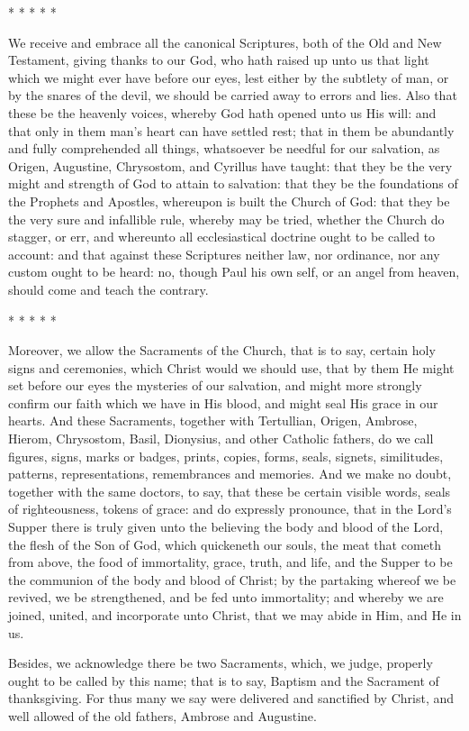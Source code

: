 * * * * *

We receive and embrace all the canonical Scriptures, both of the
Old and New Testament, giving thanks to our God, who hath raised up
unto us that light which we might ever have before our eyes, lest either
by the subtlety of man, or by the snares of the devil, we should be
carried away to errors and lies. Also that these be the heavenly
voices, whereby God hath opened unto us His will: and that only in them
man’s heart can have settled rest; that in them be abundantly
and fully comprehended all things, whatsoever be needful for our salvation,
as Origen, Augustine, Chrysostom, and Cyrillus have taught: that they
be the very might and strength of God to attain to salvation: that they
be the foundations of the Prophets and Apostles, whereupon is built
the Church of God: that they be the very sure and infallible rule, whereby
may be tried, whether the Church do stagger, or err, and whereunto all
ecclesiastical doctrine ought to be called to account: and that against
these Scriptures neither law, nor ordinance, nor
any custom ought to be heard: no, though Paul his own self, or an angel
from heaven, should come and teach the contrary.

* * * * *

Moreover, we allow the Sacraments of the Church, that is to say,
certain holy signs and ceremonies, which Christ would we should use,
that by them He might set before our eyes the mysteries of our salvation,
and might more strongly confirm our faith which we have in His blood,
and might seal His grace in our hearts. And these Sacraments,
together with Tertullian, Origen, Ambrose, Hierom, Chrysostom, Basil,
Dionysius, and other Catholic fathers, do we call figures, signs, marks
or badges, prints, copies, forms, seals, signets, similitudes, patterns,
representations, remembrances and memories. And we make no doubt,
together with the same doctors, to say, that these be certain visible
words, seals of righteousness, tokens of grace: and do expressly pronounce,
that in the Lord’s Supper there is truly given unto the believing
the body and blood of the Lord, the flesh of the Son of God, which quickeneth
our souls, the meat that cometh from above, the food of immortality,
grace, truth, and life, and the Supper to be the communion of the body
and blood of Christ; by the partaking whereof we be revived, we be strengthened,
and be fed
unto immortality; and whereby we are joined, united, and incorporate
unto Christ, that we may abide in Him, and He in us.

Besides, we acknowledge there be two Sacraments, which, we judge,
properly ought to be called by this name; that is to say, Baptism and
the Sacrament of thanksgiving. For thus many we say were delivered
and sanctified by Christ, and well allowed of the old fathers, Ambrose
and Augustine.

